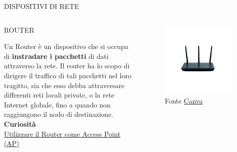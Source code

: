 \documentclass[aspectratio=1610]{beamer}
\begin{document}
\begin{frame}{DISPOSITIVI DI RETE}
    \begin{columns}
            \justifying
            \begin{alertblock}{ROUTER}
                \begin{minipage}{0.96\linewidth}
                    \justifying
                    Un Router è un dispositivo che si occupa di \textbf{instradare i pacchetti} di dati attraverso la rete. 
                    Il router ha lo scopo di dirigere il traffico di tali pacchetti nel loro tragitto, 
                    sia che esso debba attraversare differenti reti locali private, o la rete Internet 
                    globale, fino a quando non raggiungono il nodo di destinazione.\\
                    \bigskip
                    \tiny{\textbf{Curiosità}}\\
                    \tiny{\href{https://www.fastweb.it/fastweb-plus/digital-magazine/come-trasformare-il-vecchio-router-in-un-access-point-wireless/}{Utilizzare il Router come Access Point (AP)}}
                \end{minipage}
            \end{alertblock}
            \begin{figure}
                \includegraphics[width=\linewidth]{img/modemrouter.png}
                \caption{{Fonte \href{https://www.canva.com/}{Canva}}}
            \end{figure}
    \end{columns}
\end{frame}
\end{document}
